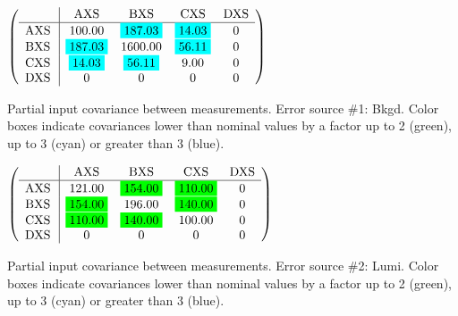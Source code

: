 \begin{table}[H]
\scriptsize
\begin{center}
\renewcommand{\arraystretch}{1.1}
\begin{math}\left(\begin{array}{c|cccc}
 & \mathrm{AXS} & 
\mathrm{BXS} & 
\mathrm{CXS} & 
\mathrm{DXS} \\
\hline
\mathrm{AXS} \hspace*{2pt} &     100.00 &  \colorbox{Cyan1}{$    187.03$} &  \colorbox{Cyan1}{$     14.03$} &  0 \\
\mathrm{BXS} \hspace*{2pt} &  \colorbox{Cyan1}{$    187.03$} &    1600.00 &  \colorbox{Cyan1}{$     56.11$} &  0 \\
\mathrm{CXS} \hspace*{2pt} &  \colorbox{Cyan1}{$     14.03$} &  \colorbox{Cyan1}{$     56.11$} &       9.00 &  0 \\
\mathrm{DXS} \hspace*{2pt} &  0 &  0 &  0 &  0 \\
\end{array}\right)\end{math}
\caption{Partial input covariance between measurements. Error source \#1: Bkgd. Color boxes indicate covariances lower than nominal values by a factor up to 2 (green), up to 3 (cyan) or greater than 3 (blue).}
\renewcommand{\arraystretch}{1}
\end{center}
\end{table}
\begin{table}[H]
\scriptsize
\begin{center}
\renewcommand{\arraystretch}{1.1}
\begin{math}\left(\begin{array}{c|cccc}
 & \mathrm{AXS} & 
\mathrm{BXS} & 
\mathrm{CXS} & 
\mathrm{DXS} \\
\hline
\mathrm{AXS} \hspace*{2pt} &     121.00 &  \colorbox{Green1}{$    154.00$} &  \colorbox{Green1}{$    110.00$} &  0 \\
\mathrm{BXS} \hspace*{2pt} &  \colorbox{Green1}{$    154.00$} &     196.00 &  \colorbox{Green1}{$    140.00$} &  0 \\
\mathrm{CXS} \hspace*{2pt} &  \colorbox{Green1}{$    110.00$} &  \colorbox{Green1}{$    140.00$} &     100.00 &  0 \\
\mathrm{DXS} \hspace*{2pt} &  0 &  0 &  0 &  0 \\
\end{array}\right)\end{math}
\caption{Partial input covariance between measurements. Error source \#2: Lumi. Color boxes indicate covariances lower than nominal values by a factor up to 2 (green), up to 3 (cyan) or greater than 3 (blue).}
\renewcommand{\arraystretch}{1}
\end{center}
\end{table}
\clearpage

